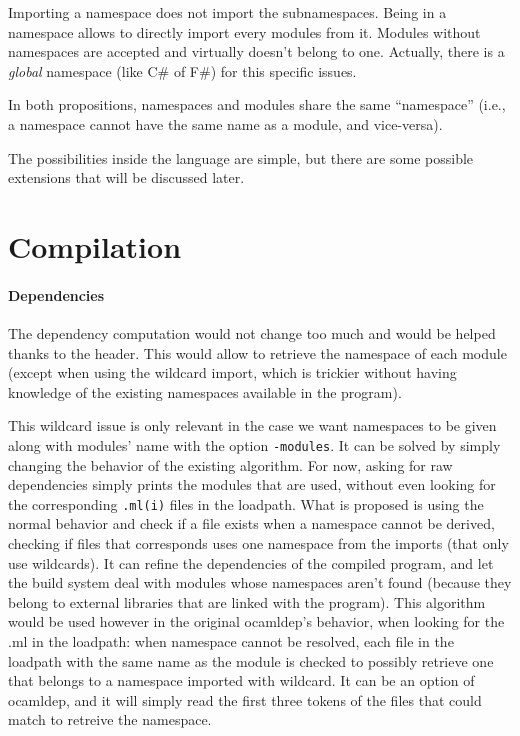Importing a namespace does not import the subnamespaces. Being in a namespace
allows to directly import every modules from it. Modules without namespaces are
accepted and virtually doesn't belong to one. Actually, there is a \emph{global}
namespace (like C\# of F\#) for this specific issues.


In both propositions, namespaces and modules share the same ``namespace'' (i.e.,
a namespace cannot have the same name as a module, and vice-versa).

The possibilities inside the language are simple, but there are some possible
extensions that will be discussed later.

\section{Compilation}

\paragraph{Dependencies}

The dependency computation would not change too much and would be helped thanks
to the header. This would allow to retrieve the namespace of each module (except
when using the wildcard import, which is trickier without having knowledge of
the existing namespaces available in the program).

This wildcard issue is only relevant in the case we want namespaces to be given
along with modules' name with the option \texttt{-modules}. It can be solved by
simply changing the behavior of the existing algorithm. For now, asking for raw
dependencies simply prints the modules that are used, without even looking for
the corresponding \texttt{.ml(i)} files in the loadpath. What is proposed is
using the normal behavior and check if a file exists when a namespace cannot be
derived, checking if files that corresponds uses one namespace from the imports
(that only use wildcards). It can refine the dependencies of the compiled
program, and let the build system deal with modules whose namespaces aren't
found (because they belong to external libraries that are linked with the
program). This algorithm would be used however in the original ocamldep's
behavior, when looking for the .ml in the loadpath: when namespace cannot be
resolved, each file in the loadpath with the same name as the module is checked
to possibly retrieve one that belongs to a namespace imported with wildcard. It
can be an option of ocamldep, and it will simply read the first three tokens of
the files that could match to retreive the namespace.


